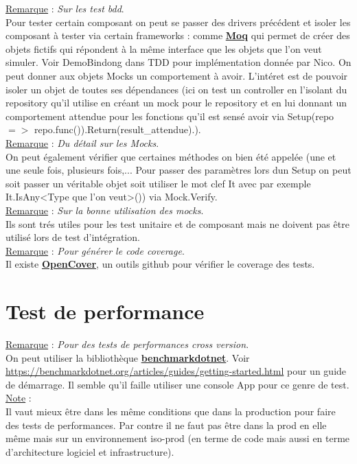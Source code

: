 \documentclass[a4paper,12pt,twoside]{article}
\newcommand{\urlcolor}{magenta}  %
\newcommand{\keycolor}{purple} %
\newcommand{\incode}[1]{{\footnotesize\ttfamily #1}} %
\newcommand{\rem}[2]{\noindent\underline{Remarque} : \textit{#1}.\\ \indent #2}
\newcommand{\note}[1]{\noindent\underline{Note} : \\ \indent #1}
\newcommand{\keyref}[2]{\hypersetup{urlcolor=\keycolor} \href{#1}{\textbf{#2}}\hypersetup{urlcolor=\urlcolor}}
\begin{document}
\rem{Sur les test bdd}{Pour tester certain composant on peut se passer des drivers précédent et isoler les composant à tester via certain frameworks : comme \keyref{https://github.com/moq/moq4}{Moq} qui permet de créer des objets fictifs qui répondent à la même interface que les objets que l'on veut simuler. Voir DemoBindong dans TDD pour implémentation donnée par Nico. On peut donner aux objets Mocks un comportement à avoir. L'intéret est de pouvoir isoler un objet de toutes ses dépendances (ici on test un controller en l'isolant du repository qu'il utilise en créant un mock pour le repository et en lui donnant un comportement attendue pour les fonctions qu'il est sensé avoir via \incode{Setup(repo $=>$ repo.func()).Return(result\_attendue)}.).}\\

\rem{Du détail sur les Mocks}{On peut également vérifier que certaines méthodes on bien été appelée (une et une seule fois, plusieurs fois,... Pour passer des paramètres lors dun \incode{Setup} on peut soit passer un véritable objet soit utiliser le mot clef \incode{It} avec par exemple It.IsAny<Type que l'on veut>()) via \incode{Mock.Verify}.}\\

\rem{Sur la bonne utilisation des mocks}{Ils sont trés utiles pour les test unitaire et de composant mais ne doivent pas être utilisé lors de test d'intégration.}\\

\rem{Pour générer le code coverage}{Il existe \keyref{https://github.com/OpenCover/opencover}{OpenCover}, un outils github pour vérifier le coverage des tests.}\\

\section{Test de performance}

\rem{Pour des tests de performances cross version}{On peut utiliser la bibliothèque \keyref{https://benchmarkdotnet.org/}{benchmarkdotnet}. Voir \url{https://benchmarkdotnet.org/articles/guides/getting-started.html} pour un guide de démarrage. Il semble qu'il faille utiliser une console App pour ce genre de test.}\\

\note{Il vaut mieux être dans les même conditions que dans la production pour faire des tests de performances. Par contre il ne faut pas être dans la prod en elle même mais sur un environnement iso-prod (en terme de code mais aussi en terme d'architecture logiciel et infrastructure).}\\
\end{document}
